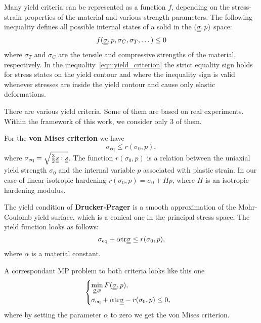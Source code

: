 \documentclass[12pt]{article}
\begin{document}
Many yield criteria can be represented as a function $f$, depending on the stress-strain properties of the material and various strength parameters. The following inequality defines all possible internal states of a solid in the $(\underline{\underline{\sigma}}, p)$ space:
\begin{equation}\label{eqn:yield_criterion}
    f(\underline{\underline{\sigma}}, p, \sigma_C, \sigma_T, \dots) \leq 0
\end{equation}
where $\sigma_T$ and $\sigma_C$ are the tensile and compressive strengths of the material, respectively. In the inequality~\eqref{eqn:yield_criterion} the strict equality sign holds for stress states on the yield contour and where the inequality sign is valid whenever stresses are inside the yield contour and cause only elastic deformations.

There are various yield criteria. Some of them are based on real experiments. Within the framework of this work, we consider only 3 of them. 

For the \textbf{von Mises criterion} we have
\begin{equation*}
    \sigma_\text{eq} \leq r(\sigma_0, p),
\end{equation*}
where $\sigma_\text{eq} = \sqrt{\frac{3}{2}\underline{\underline{s}} : \underline{\underline{s}}}$. The function $r(\sigma_0, p)$ is a relation between the uniaxial yield strength $\sigma_0$ and the internal variable $p$ associated with plastic strain. In our case of linear isotropic hardening $r(\sigma_0, p) = \sigma_0 + Hp$, where $H$ is an isotropic hardening modulus.

The yield condition of \textbf{Drucker-Prager} is a smooth approximation of the Mohr-Coulomb yield surface, which is a conical one in the principal stress space. The yield function looks as follows:
\begin{equation*}
    \sigma_\text{eq} + \alpha\mathrm{tr}\underline{\underline{\sigma}} \leq r(\sigma_0, p),
\end{equation*}
where $\alpha$ is a material constant.

A correspondant MP problem to both criteria looks like this one
\begin{equation*}
    \begin{cases}
        \min\limits_{\underline{\underline{\sigma}}, p} F(\underline{\underline{\sigma}}, p), \\
        \sigma_\text{eq} + \alpha\mathrm{tr}\underline{\underline{\sigma}} - r(\sigma_0, p) \leq 0,
    \end{cases}
\end{equation*}
where by setting the parameter $\alpha$ to zero we get the von Mises criterion. 
\end{document}
